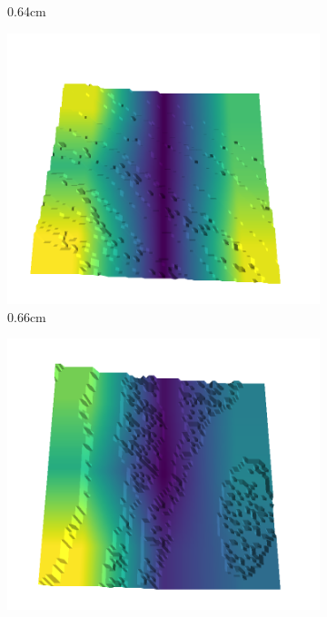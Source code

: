 \begin{figure}[H]
\begin{subfigure}[b]{0.192\linewidth}
    \caption{0.64cm}
    \label{fig : quarry-best-16}
    \end{subfigure}
    \begin{subfigure}[b]{0.192\linewidth}
    \includegraphics[width=\linewidth]{../img/5/quarry/best/65-patch-3d-majavi-colormap-160.png}
    \caption{0.66cm}
    \label{fig : quarry-best-17}
    \end{subfigure}
    \begin{subfigure}[b]{0.192\linewidth}
    \includegraphics[width=\linewidth]{../img/5/quarry/best/67-patch-3d-majavi-colormap-170.png}

\end{subfigure}
\end{figure}
